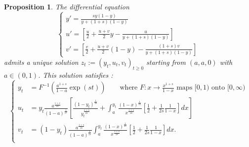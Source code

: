 \documentclass[11pt]{article}
\newtheorem{proposition}[theorem]{Proposition}
\theoremstyle{remark}
\numberwithin{equation}{section}
\begin{document}
\begin{proposition} \label{prop-z} The differential equation 
\begin{equation}\label{eq:dyn-system}\begin{cases}y'=\frac{sy(1-y)}{y+(1+s)(1-y)}\\u'=\left[\frac{u}{2}+\frac{u+v}{2}y-\frac{u}{y+(1+s)(1-y)}\right]\\
v'=\left[\frac{v}{2}+\frac{u+v}{2}(1-y)-\frac{(1+s)v}{y+(1+s)(1-y)}\right]\end{cases}\end{equation} admits a unique solution $z_t:=(y_t,u_t,v_t)_{t\geq0}$ starting from $(a,a,0)$ with $a\in(0,1)$. This solution satisfies :
\begin{equation}\label{eq-sol-syst}\left\{\begin{aligned}
      y_t&= F^{-1}\left(\frac{a^{1+s}}{1-a}\exp(st)\right) \qquad\text{where $F:x\rightarrow\frac{x^{1+s}}{1-x}$ maps $[0,1)$ onto $[0,\infty)$}\\
      u_t&= y_t\frac{a^{\frac{1+s}{2s}}}{(1-a)^{\frac{1}{2s}}}\left[\frac{(1-y_t)^{\frac{1}{2s}}}{y_t^{\frac{1+s}{2s}}}+\int_a^{y_t}\frac{(1-x)^{\frac{1}{2s}}}{x^{\frac{1+s}{2s}}}\left[\frac{1}{2}+\frac{1}{2s}\frac{1}{1-x}\right]dx\right] \\
      v_t&= (1-y_t)\frac{a^{\frac{1+s}{2s}}}{(1-a)^{\frac{1}{2s}}}\int_a^{y_t}\frac{(1-x)^{\frac{1}{2s}}}{x^{\frac{1+s}{2s}}}\left[\frac{1}{2}+\frac{1}{2s}\frac{1}{1-x}\right]dx. \\
    \end{aligned}\right.\end{equation}
\end{proposition}
\end{document}
